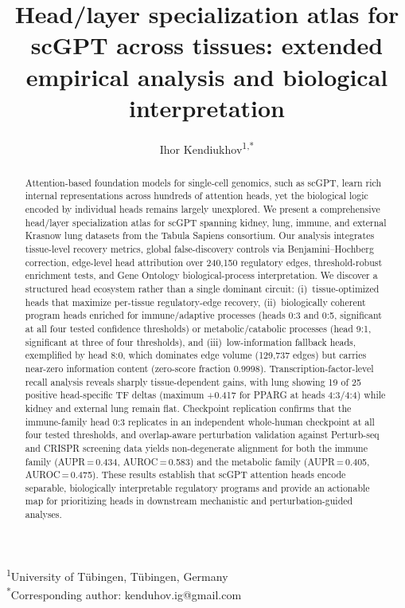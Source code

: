 \documentclass[11pt]{article}
\title{Head/layer specialization atlas for scGPT across tissues: extended empirical analysis and biological interpretation}
\author{Ihor Kendiukhov\textsuperscript{1,*}}
\date{}
\makeatletter
\newcommand{\affiliation}{\textsuperscript{1}University of T\"ubingen, T\"ubingen, Germany}
\newcommand{\corresponding}{\textsuperscript{*}Corresponding author: kenduhov.ig@gmail.com}
\makeatother
\begin{document}
\sloppy
\maketitle

\noindent\affiliation\\
\corresponding

\begin{abstract}
Attention-based foundation models for single-cell genomics, such as scGPT, learn rich internal representations across hundreds of attention heads, yet the biological logic encoded by individual heads remains largely unexplored.
We present a comprehensive head/layer specialization atlas for scGPT spanning kidney, lung, immune, and external Krasnow lung datasets from the Tabula Sapiens consortium.
Our analysis integrates tissue-level recovery metrics, global false-discovery controls via Benjamini--Hochberg correction, edge-level head attribution over 240,150 regulatory edges, threshold-robust enrichment tests, and Gene Ontology biological-process interpretation.
We discover a structured head ecosystem rather than a single dominant circuit: (i)~tissue-optimized heads that maximize per-tissue regulatory-edge recovery, (ii)~biologically coherent program heads enriched for immune/adaptive processes (heads 0:3 and 0:5, significant at all four tested confidence thresholds) or metabolic/catabolic processes (head 9:1, significant at three of four thresholds), and (iii)~low-information fallback heads, exemplified by head 8:0, which dominates edge volume (129,737 edges) but carries near-zero information content (zero-score fraction 0.9998).
Transcription-factor-level recall analysis reveals sharply tissue-dependent gains, with lung showing 19 of 25 positive head-specific TF deltas (maximum +0.417 for PPARG at heads 4:3/4:4) while kidney and external lung remain flat.
Checkpoint replication confirms that the immune-family head 0:3 replicates in an independent whole-human checkpoint at all four tested thresholds, and overlap-aware perturbation validation against Perturb-seq and CRISPR screening data yields non-degenerate alignment for both the immune family (AUPR\,=\,0.434, AUROC\,=\,0.583) and the metabolic family (AUPR\,=\,0.405, AUROC\,=\,0.475).
These results establish that scGPT attention heads encode separable, biologically interpretable regulatory programs and provide an actionable map for prioritizing heads in downstream mechanistic and perturbation-guided analyses.
\end{abstract}

\end{document}
